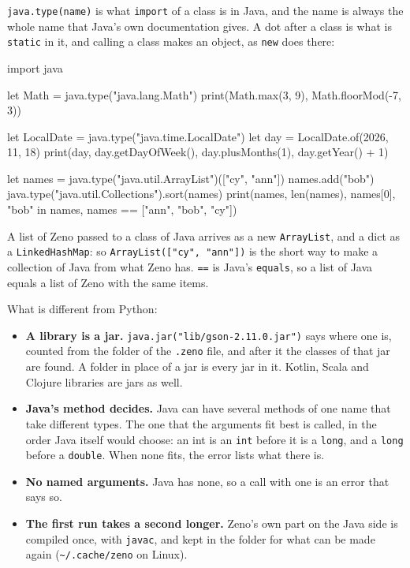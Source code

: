 \verb|java.type(name)| is what \verb|import| of a class is in Java,
and the name is always the whole name that Java's own documentation
gives. A dot after a class is what is \verb|static| in it, and calling
a class makes an object, as \verb|new| does there:

\begin{zeno}[file=classes.zeno]
import java

let Math = java.type("java.lang.Math")
print(Math.max(3, 9), Math.floorMod(-7, 3))

let LocalDate = java.type("java.time.LocalDate")
let day = LocalDate.of(2026, 11, 18)
print(day, day.getDayOfWeek(), day.plusMonths(1), day.getYear() + 1)

let names = java.type("java.util.ArrayList")(["cy", "ann"])
names.add("bob")
java.type("java.util.Collections").sort(names)
print(names, len(names), names[0], "bob" in names, names == ["ann", "bob", "cy"])
\end{zeno}

A list of Zeno passed to a class of Java arrives as a new
\verb|ArrayList|, and a dict as a \verb|LinkedHashMap|: so
\verb|ArrayList(["cy", "ann"])| is the short way to make a collection
of Java from what Zeno has. \verb|==| is Java's \verb|equals|, so a
list of Java equals a list of Zeno with the same items.

What is different from Python:

\begin{itemize}
\item \textbf{A library is a jar.} \verb|java.jar("lib/gson-2.11.0.jar")|
  says where one is, counted from the folder of the \verb|.zeno| file,
  and after it the classes of that jar are found. A folder in place of
  a jar is every jar in it. Kotlin, Scala and Clojure libraries are
  jars as well.
\item \textbf{Java's method decides.} Java can have several methods of
  one name that take different types. The one that the arguments fit
  best is called, in the order Java itself would choose: an int is an
  \verb|int| before it is a \verb|long|, and a \verb|long| before a
  \verb|double|. When none fits, the error lists what there is.
\item \textbf{No named arguments.} Java has none, so a call with one is
  an error that says so.
\item \textbf{The first run takes a second longer.} Zeno's own part on
  the Java side is compiled once, with \verb|javac|, and kept in the
  folder for what can be made again (\verb|~/.cache/zeno| on Linux).
\end{itemize}

